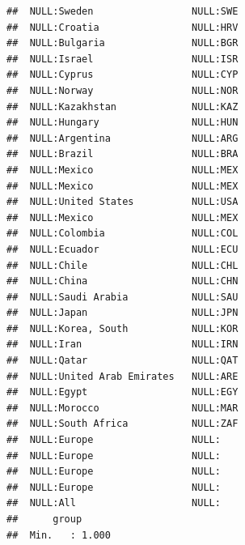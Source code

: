 \documentclass{article}\usepackage[]{graphicx}\usepackage[]{color}
\makeatletter
\newenvironment{kframe}{%
 \def\at@end@of@kframe{}%
 \ifinner\ifhmode%
  \def\at@end@of@kframe{\end{minipage}}%
  \begin{minipage}{\columnwidth}%
 \fi\fi%
 \def\FrameCommand##1{\hskip\@totalleftmargin \hskip-\fboxsep
 \colorbox{shadecolor}{##1}\hskip-\fboxsep
     \hskip-\linewidth \hskip-\@totalleftmargin \hskip\columnwidth}%
 \MakeFramed {\advance\hsize-\width
   \@totalleftmargin\z@ \linewidth\hsize
   \@setminipage}}%
 {\par\unskip\endMakeFramed%
 \at@end@of@kframe}
\newenvironment{knitrout}{}{} %
\makeatother
\begin{document}
\begin{knitrout}
\begin{kframe}
\begin{verbatim}
##  NULL:Sweden                 NULL:SWE                                       
##  NULL:Croatia                NULL:HRV                                       
##  NULL:Bulgaria               NULL:BGR                                       
##  NULL:Israel                 NULL:ISR                                       
##  NULL:Cyprus                 NULL:CYP                                       
##  NULL:Norway                 NULL:NOR                                       
##  NULL:Kazakhstan             NULL:KAZ                                       
##  NULL:Hungary                NULL:HUN                                       
##  NULL:Argentina              NULL:ARG                                       
##  NULL:Brazil                 NULL:BRA                                       
##  NULL:Mexico                 NULL:MEX                                       
##  NULL:Mexico                 NULL:MEX                                       
##  NULL:United States          NULL:USA                                       
##  NULL:Mexico                 NULL:MEX                                       
##  NULL:Colombia               NULL:COL                                       
##  NULL:Ecuador                NULL:ECU                                       
##  NULL:Chile                  NULL:CHL                                       
##  NULL:China                  NULL:CHN                                       
##  NULL:Saudi Arabia           NULL:SAU                                       
##  NULL:Japan                  NULL:JPN                                       
##  NULL:Korea, South           NULL:KOR                                       
##  NULL:Iran                   NULL:IRN                                       
##  NULL:Qatar                  NULL:QAT                                       
##  NULL:United Arab Emirates   NULL:ARE                                       
##  NULL:Egypt                  NULL:EGY                                       
##  NULL:Morocco                NULL:MAR                                       
##  NULL:South Africa           NULL:ZAF                                       
##  NULL:Europe                 NULL:                                          
##  NULL:Europe                 NULL:                                          
##  NULL:Europe                 NULL:                                          
##  NULL:Europe                 NULL:                                          
##  NULL:All                    NULL:                                          
##      group       
##  Min.   : 1.000  

\end{verbatim}
\end{kframe}
\end{knitrout}
\end{document}
